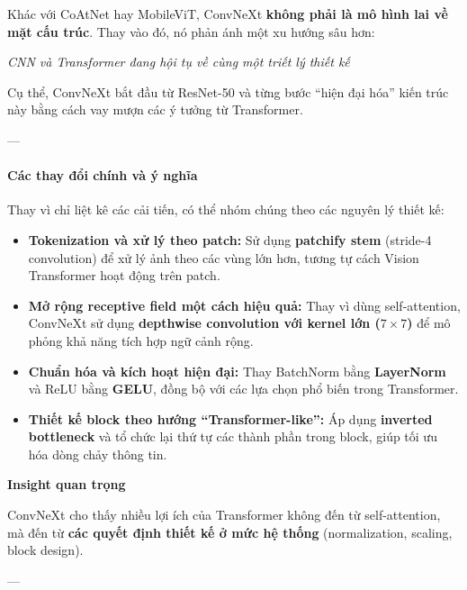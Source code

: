 Khác với CoAtNet hay MobileViT, ConvNeXt \textbf{không phải là mô hình lai về mặt cấu trúc}.  
Thay vào đó, nó phản ánh một xu hướng sâu hơn:
\begin{center}
	\textit{CNN và Transformer đang hội tụ về cùng một triết lý thiết kế}
\end{center}

Cụ thể, ConvNeXt bắt đầu từ ResNet-50 và từng bước “hiện đại hóa” kiến trúc này bằng cách vay mượn các ý tưởng từ Transformer.

---

\paragraph{Các thay đổi chính và ý nghĩa}

Thay vì chỉ liệt kê các cải tiến, có thể nhóm chúng theo các nguyên lý thiết kế:

\begin{itemize}
	\item \textbf{Tokenization và xử lý theo patch:}  
	Sử dụng \textbf{patchify stem} (stride-4 convolution) để xử lý ảnh theo các vùng lớn hơn, tương tự cách Vision Transformer hoạt động trên patch.
	
	\item \textbf{Mở rộng receptive field một cách hiệu quả:}  
	Thay vì dùng self-attention, ConvNeXt sử dụng \textbf{depthwise convolution với kernel lớn ($7\times7$)} để mô phỏng khả năng tích hợp ngữ cảnh rộng.
	
	\item \textbf{Chuẩn hóa và kích hoạt hiện đại:}  
	Thay BatchNorm bằng \textbf{LayerNorm} và ReLU bằng \textbf{GELU}, đồng bộ với các lựa chọn phổ biến trong Transformer.
	
	\item \textbf{Thiết kế block theo hướng “Transformer-like”:}  
	Áp dụng \textbf{inverted bottleneck} và tổ chức lại thứ tự các thành phần trong block, giúp tối ưu hóa dòng chảy thông tin.
\end{itemize}

\begin{mdframed}[style=infobox]
	\textbf{Insight quan trọng}
	
	ConvNeXt cho thấy nhiều lợi ích của Transformer không đến từ self-attention,  
	mà đến từ \textbf{các quyết định thiết kế ở mức hệ thống} (normalization, scaling, block design).
\end{mdframed}

---

